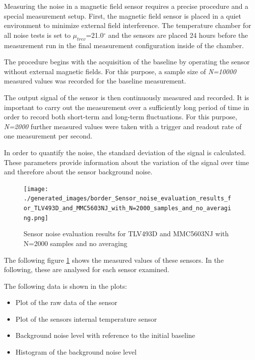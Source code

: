 Measuring the noise in a magnetic field sensor requires a precise
procedure and a special measurement setup. First, the magnetic field
sensor is placed in a quiet environment to minimize external field
interference. The temperature chamber for all noise tests is set to
\(\mu_{trev}\)=21.0\(^{\circ}\) and the sensors are placed 24 hours
before the measurement run in the final measurement configuration inside
of the chamber.

The procedure begins with the acquisition of the baseline by operating
the sensor without external magnetic fields. For this purpose, a sample
size of \emph{N=10000} measured values was recorded for the baseline
measurement.

The output signal of the sensor is then continuously measured and
recorded. It is important to carry out the measurement over a
sufficiently long period of time in order to record both short-term and
long-term fluctuations. For this purpose, \emph{N=2000} further measured
values were taken with a trigger and readout rate of one measurement per
second.

In order to quantify the noise, the standard deviation of the signal is
calculated. These parameters provide information about the variation of
the signal over time and therefore about the sensor background noise.

\begin{figure}
\centering
\texttt{[image: ./generated\_images/border\_Sensor\_noise\_evaluation\_results\_for\_TLV493D\_and\_MMC5603NJ\_with\_N=2000\_samples\_and\_no\_averaging.png]}
\caption{Sensor noise evaluation results for TLV493D and MMC5603NJ with
N=2000 samples and no averaging
\label{Sensor_noise_evaluation_results_for_TLV493D_and_MMC5603NJ_with_N=2000_samples_and_no_averaging.png}}
\end{figure}

The following figure
\ref{Sensor_noise_evaluation_results_for_TLV493D_and_MMC5603NJ_with_N=2000_samples_and_no_averaging.png}
shows the measured values of these sensors. In the following, these are
analysed for each sensor examined.

The following data is shown in the plots:

\begin{itemize}
\tightlist
\item
  Plot of the raw data of the sensor
\item
  Plot of the sensors internal temperature sensor
\item
  Background noise level with reference to the initial baseline
\item
  Histogram of the background noise level
\end{itemize}


